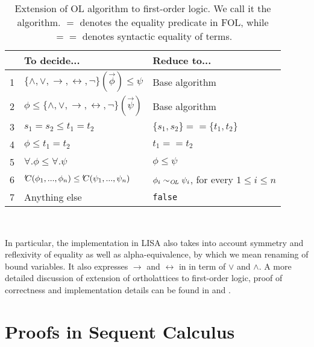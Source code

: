 \begin{table}[ht]
  \centering
  \begin{tabular}{c | l | l}
      & To decide... & Reduce to...\\
       \hline
     1&  $\lbrace \land, \lor, \rightarrow, \leftrightarrow, \neg \rbrace(\vec{\phi}) \leq \psi $ & Base algorithm \\
      2& $\phi \leq \lbrace \land, \lor, \rightarrow, \leftrightarrow, \neg \rbrace(\vec{\psi}) $ & Base algorithm \\
      3& $s_1 = s_2 \leq t_1 = t_2$ & $\lbrace s_1, s_2 \rbrace == \lbrace t_1, t_2 \rbrace$\\
      4& $\phi \leq t_1 = t_2$ & $t_1 == t_2$\\
      5 & $\forall. \phi \leq \forall. \psi$ & $\phi \leq \psi$\\
      6& ${'\hspace{-0.2em}C}(\phi_1,...,\phi_n) \leq {'\hspace{-0.2em}C}(\psi_1,...,\psi_n)$ & $\phi_i \sim_{\mathit{O{\kern-0.1em}L}} \psi_i$, for every $1 \le i \le n$\\
       
      7& Anything else & \texttt{false}
  \end{tabular}
  
  \
  
  \caption{Extension of OL algorithm to first-order logic. We call it the \FOLalg{} algorithm. $=$ denotes the equality predicate in FOL, while $==$ denotes syntactic equality of terms.
  \label{tab:Olextension}}
\end{table}


In particular, the implementation in LISA also takes into account symmetry and reflexivity of equality as well as alpha-equivalence, by which we mean renaming of bound variables. It also expresses $\rightarrow$ and $\leftrightarrow$ in in term of $\lor$ and $\land$.
A more detailed discussion of extension of ortholattices to first-order logic, proof of correctness and implementation details can be found in \cite{guilloudFormulaNormalizationsVerification2023a} and \cite{guilloudLISAModernProof2023a}.




\section{Proofs in Sequent Calculus}
\label{sect:proofs_lk}
